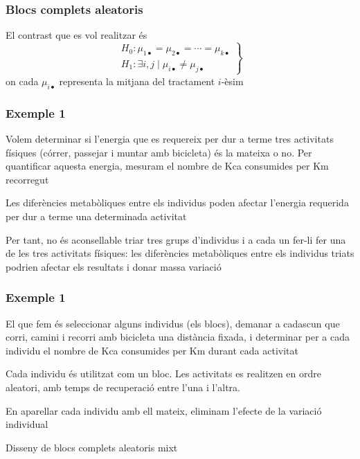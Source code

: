 \documentclass[12pt,t]{beamer}
\renewcommand{\emph}[1]{{\color{red}#1}}
\theoremstyle{plain}
\theoremstyle{definition}
\begin{document}
\begin{frame}
\frametitle{Blocs complets aleatoris}

El contrast que es vol realitzar és
$$
\left.
\begin{array}{l}
H_0 : \mu_{1\bullet} =\mu_{2\bullet} =\cdots =\mu_{k\bullet} \\
H_1 : \exists i,j \mid  \mu_{i\bullet} \not=\mu_{j\bullet}
\end{array}
\right\}
$$
on cada $\mu_{i\bullet}$ representa la mitjana del tractament $i$-èsim 
\end{frame}





\begin{frame}
\frametitle{Exemple 1}
Volem determinar si l'energia que es requereix per dur a terme tres activitats físiques (córrer, passejar i muntar amb bicicleta) és la mateixa o no. Per quantificar aquesta energia, mesuram el nombre de Kca consumides per Km
recorregut
\medskip

Les diferències metabòliques entre els individus poden afectar l'energia requerida per dur a terme una determinada
activitat
\medskip

Per tant, no és aconsellable triar tres grups d'individus i a cada un fer-li fer una de les tres activitats físiques: les diferències metabòliques entre els individus triats podrien  afectar els resultats i donar massa variació
\end{frame}



\begin{frame}
\frametitle{Exemple 1}

El que fem és seleccionar alguns individus (els \emph{blocs}), demanar a cadascun
que corri, camini i recorri amb bicicleta una distància fixada, i determinar per a cada individu el nombre
de Kca consumides per Km durant cada activitat
\medskip

Cada individu és utilitzat com un bloc.  Les activitats es realitzen en ordre aleatori, amb temps de recuperació entre
l'una i l'altra.
\medskip

En aparellar cada individu amb ell mateix, eliminam l'efecte de la variació individual
\medskip

\emph{Disseny de blocs complets aleatoris mixt}


\end{frame}
\end{document}
